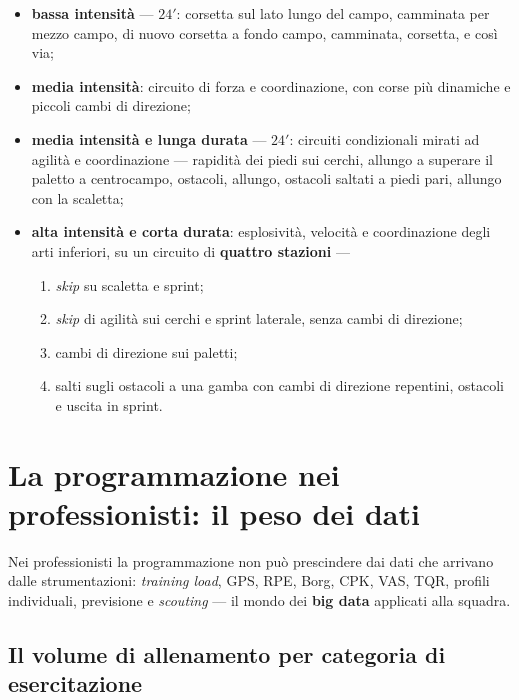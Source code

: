 \begin{itemize}
  \item \textbf{bassa intensità} --- $24'$: corsetta sul lato lungo del campo, camminata per
    mezzo campo, di nuovo corsetta a fondo campo, camminata, corsetta, e così via;
  \item \textbf{media intensità}: circuito di forza e coordinazione, con corse più dinamiche e
    piccoli cambi di direzione;
  \item \textbf{media intensità e lunga durata} --- $24'$: circuiti condizionali mirati ad agilità e
    coordinazione --- rapidità dei piedi sui cerchi, allungo a superare il paletto a centrocampo,
    ostacoli, allungo, ostacoli saltati a piedi pari, allungo con la scaletta;
  \item \textbf{alta intensità e corta durata}: esplosività, velocità e coordinazione degli arti
    inferiori, su un circuito di \textbf{quattro stazioni} ---
    \begin{enumerate}
      \item \textit{skip} su scaletta e sprint;
      \item \textit{skip} di agilità sui cerchi e sprint laterale, senza cambi di direzione;
      \item cambi di direzione sui paletti;
      \item salti sugli ostacoli a una gamba con cambi di direzione repentini, ostacoli e uscita in
        sprint.
    \end{enumerate}
\end{itemize}

\section{La programmazione nei professionisti: il peso dei dati}

Nei professionisti la programmazione non può prescindere dai dati che arrivano dalle strumentazioni:
\textit{training load}, GPS, RPE, Borg, CPK, VAS, TQR, profili individuali, previsione e
\textit{scouting} --- il mondo dei \textbf{big data} applicati alla squadra.

\subsection{Il volume di allenamento per categoria di esercitazione}

